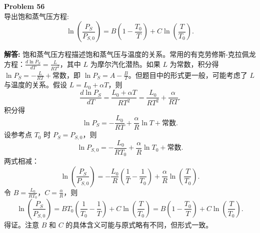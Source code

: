 \documentclass[12pt, a4paper, oneside]{ctexart}
\newenvironment{solution}{\par\noindent\textbf{解答:}\quad}{\par}
\begin{document}
\begin{mdframed}[backgroundcolor=gray!10, linewidth=0pt]
    \textbf{Problem 56} \\
    导出饱和蒸气压方程:
    \[
    \ln\left(\frac{P_S}{P_{S,0}}\right) = B \left(1 - \frac{T_0}{T}\right) + C \ln\left(\frac{T}{T_0}\right).
    \]
\end{mdframed}
\begin{solution}
    饱和蒸气压方程描述饱和蒸气压与温度的关系。常用的有克劳修斯-克拉佩龙方程：$\frac{d \ln P_S}{dT} = \frac{L}{RT^2}$，其中 $L$ 为摩尔汽化潜热。如果 $L$ 为常数，积分得 $\ln P_S = -\frac{L}{RT} + \text{常数}$，即 $\ln P_S = A - \frac{B}{T}$。但题目中的形式更一般，可能考虑了 $L$ 与温度的关系。假设 $L = L_0 + \alpha T$，则
    \[
    \frac{d \ln P_S}{dT} = \frac{L_0 + \alpha T}{RT^2} = \frac{L_0}{RT^2} + \frac{\alpha}{RT}.
    \]
    积分得
    \[
    \ln P_S = -\frac{L_0}{RT} + \frac{\alpha}{R} \ln T + \text{常数}.
    \]
    设参考点 $T_0$ 时 $P_S = P_{S,0}$，则
    \[
    \ln P_{S,0} = -\frac{L_0}{RT_0} + \frac{\alpha}{R} \ln T_0 + \text{常数}.
    \]
    两式相减：
    \[
    \ln\left(\frac{P_S}{P_{S,0}}\right) = -\frac{L_0}{R} \left(\frac{1}{T} - \frac{1}{T_0}\right) + \frac{\alpha}{R} \ln\left(\frac{T}{T_0}\right).
    \]
    令 $B = \frac{L_0}{R T_0}$，$C = \frac{\alpha}{R}$，则
    \[
    \ln\left(\frac{P_S}{P_{S,0}}\right) = B T_0 \left(\frac{1}{T_0} - \frac{1}{T}\right) + C \ln\left(\frac{T}{T_0}\right) = B \left(1 - \frac{T_0}{T}\right) + C \ln\left(\frac{T}{T_0}\right).
    \]
    得证。注意 $B$ 和 $C$ 的具体含义可能与原式略有不同，但形式一致。
\end{solution}
\end{document}
